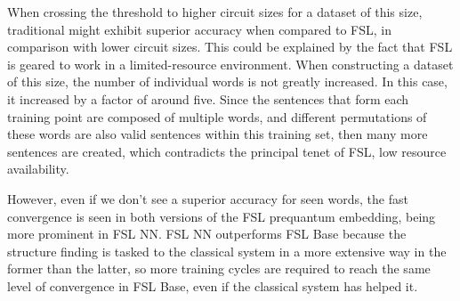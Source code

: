 When crossing the threshold to higher circuit sizes for a dataset of this size, traditional \mya might exhibit superior accuracy when compared to FSL, in comparison with lower circuit sizes. This could be explained by the fact that FSL is geared to work in a limited-resource environment. When constructing a dataset of this size, the number of individual words is not greatly increased. In this case, it increased by a factor of around five. Since the sentences that form each training point are composed of multiple words, and different permutations of these words are also valid sentences within this training set, then many more sentences are created, which contradicts the principal tenet of FSL, low resource availability.



However, even if we don't see a superior accuracy for seen words, the fast convergence is seen in both versions of the FSL prequantum embedding, being more prominent in FSL NN. FSL NN outperforms FSL Base because the structure finding is tasked to the classical system in a more extensive way in the former than the latter, so more training cycles are required to reach the same level of convergence in FSL Base, even if the classical system has helped it.

